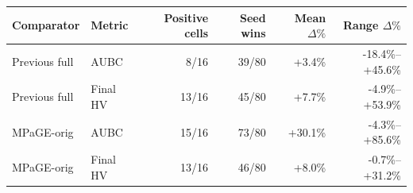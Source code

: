 \begin{tabular}{llrrrr}
\toprule
Comparator & Metric & Positive cells & Seed wins & Mean $\Delta\%$ & Range $\Delta\%$ \\
\midrule
Previous full & AUBC & 8/16 & 39/80 & +3.4\% & -18.4\%--+45.6\% \\
Previous full & Final HV & 13/16 & 45/80 & +7.7\% & -4.9\%--+53.9\% \\
MPaGE-orig & AUBC & 15/16 & 73/80 & +30.1\% & -4.3\%--+85.6\% \\
MPaGE-orig & Final HV & 13/16 & 46/80 & +8.0\% & -0.7\%--+31.2\% \\
\bottomrule
\end{tabular}
